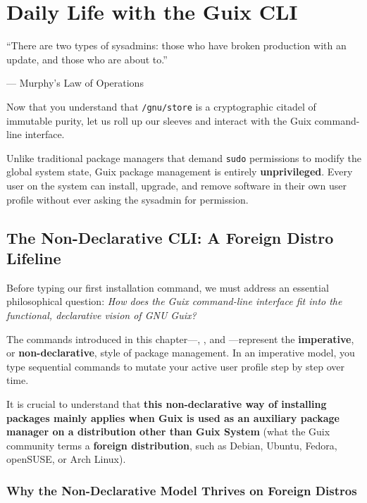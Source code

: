 \chapter{Daily Life with the Guix CLI}
\label{chap:cli-daily-life}

\epigraph{``There are two types of sysadmins: those who have broken production with an update, and those who are about to.''}{--- Murphy's Law of Operations}

\noindent
Now that you understand that \texttt{/gnu/store} is a cryptographic citadel of immutable purity, let us roll up our sleeves and interact with the Guix command-line interface.

Unlike traditional package managers that demand \texttt{sudo} permissions to modify the global system state, Guix package management is entirely \textbf{unprivileged}. Every user on the system can install, upgrade, and remove software in their own user profile without ever asking the sysadmin for permission.

\section{The Non-Declarative CLI: A Foreign Distro Lifeline}

Before typing our first installation command, we must address an essential philosophical question: \emph{How does the Guix command-line interface fit into the functional, declarative vision of GNU Guix?}

The commands introduced in this chapter---, , and ---represent the \textbf{imperative}, or \textbf{non-declarative}, style of package management. In an imperative model, you type sequential commands to mutate your active user profile step by step over time.

It is crucial to understand that \textbf{this non-declarative way of installing packages mainly applies when Guix is used as an auxiliary package manager on a distribution other than Guix System} (what the Guix community terms a \textbf{foreign distribution}, such as Debian, Ubuntu, Fedora, openSUSE, or Arch Linux).

\subsection{Why the Non-Declarative Model Thrives on Foreign Distros}

